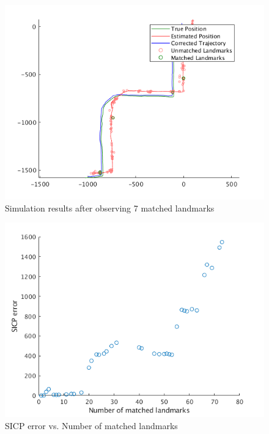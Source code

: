 \documentclass[letterpaper, 10 pt, conference]{ieeeconf}  %
\begin{document}
\begin{figure}[thpb]
  \centering
  \includegraphics[width=\linewidth]{sim_results.png}
  \caption{Simulation results after observing 7 matched landmarks}
  \label{fig:simresults}
\end{figure}

\begin{figure}[thpb]
  \centering
  \includegraphics[width=\linewidth]{sicp_err.png}
  \caption{SICP error vs. Number of matched landmarks}
  \label{fig:sicperr}
\end{figure}
\end{document}
